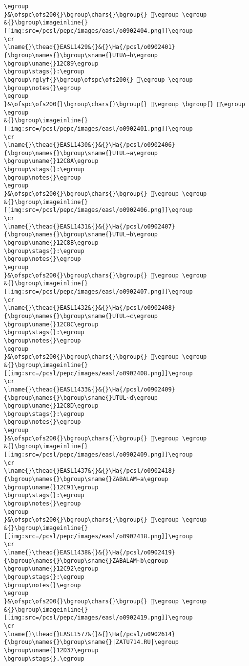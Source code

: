 \begin{verbatim}
\egroup
}&\ofspc\ofs200{}\bgroup\chars{}\bgroup{} 𒲇\egroup \egroup
&{}\bgroup\imageinline{}[[img:src=/pcsl/pepc/images/easl/o0902404.png]]\egroup
\cr
\lname{}\thead{}EASL1429&{}&{}\Ha{/pcsl/o0902401}{\bgroup\names{}\bgroup\sname{}UTUA∼b\egroup
\bgroup\uname{}12C89\egroup
\bgroup\stags{}:\egroup
\bgroup\rglyf{}\bgroup\ofspc\ofs200{} 𒲉\egroup \egroup
\bgroup\notes{}\egroup
\egroup
}&\ofspc\ofs200{}\bgroup\chars{}\bgroup{} 𒲈\egroup \bgroup{} 𒲉\egroup \egroup
&{}\bgroup\imageinline{}[[img:src=/pcsl/pepc/images/easl/o0902401.png]]\egroup
\cr
\lname{}\thead{}EASL1430&{}&{}\Ha{/pcsl/o0902406}{\bgroup\names{}\bgroup\sname{}UTUL∼a\egroup
\bgroup\uname{}12C8A\egroup
\bgroup\stags{}:\egroup
\bgroup\notes{}\egroup
\egroup
}&\ofspc\ofs200{}\bgroup\chars{}\bgroup{} 𒲊\egroup \egroup
&{}\bgroup\imageinline{}[[img:src=/pcsl/pepc/images/easl/o0902406.png]]\egroup
\cr
\lname{}\thead{}EASL1431&{}&{}\Ha{/pcsl/o0902407}{\bgroup\names{}\bgroup\sname{}UTUL∼b\egroup
\bgroup\uname{}12C8B\egroup
\bgroup\stags{}:\egroup
\bgroup\notes{}\egroup
\egroup
}&\ofspc\ofs200{}\bgroup\chars{}\bgroup{} 𒲋\egroup \egroup
&{}\bgroup\imageinline{}[[img:src=/pcsl/pepc/images/easl/o0902407.png]]\egroup
\cr
\lname{}\thead{}EASL1432&{}&{}\Ha{/pcsl/o0902408}{\bgroup\names{}\bgroup\sname{}UTUL∼c\egroup
\bgroup\uname{}12C8C\egroup
\bgroup\stags{}:\egroup
\bgroup\notes{}\egroup
\egroup
}&\ofspc\ofs200{}\bgroup\chars{}\bgroup{} 𒲌\egroup \egroup
&{}\bgroup\imageinline{}[[img:src=/pcsl/pepc/images/easl/o0902408.png]]\egroup
\cr
\lname{}\thead{}EASL1433&{}&{}\Ha{/pcsl/o0902409}{\bgroup\names{}\bgroup\sname{}UTUL∼d\egroup
\bgroup\uname{}12C8D\egroup
\bgroup\stags{}:\egroup
\bgroup\notes{}\egroup
\egroup
}&\ofspc\ofs200{}\bgroup\chars{}\bgroup{} 𒲍\egroup \egroup
&{}\bgroup\imageinline{}[[img:src=/pcsl/pepc/images/easl/o0902409.png]]\egroup
\cr
\lname{}\thead{}EASL1437&{}&{}\Ha{/pcsl/o0902418}{\bgroup\names{}\bgroup\sname{}ZABALAM∼a\egroup
\bgroup\uname{}12C91\egroup
\bgroup\stags{}:\egroup
\bgroup\notes{}\egroup
\egroup
}&\ofspc\ofs200{}\bgroup\chars{}\bgroup{} 𒲑\egroup \egroup
&{}\bgroup\imageinline{}[[img:src=/pcsl/pepc/images/easl/o0902418.png]]\egroup
\cr
\lname{}\thead{}EASL1438&{}&{}\Ha{/pcsl/o0902419}{\bgroup\names{}\bgroup\sname{}ZABALAM∼b\egroup
\bgroup\uname{}12C92\egroup
\bgroup\stags{}:\egroup
\bgroup\notes{}\egroup
\egroup
}&\ofspc\ofs200{}\bgroup\chars{}\bgroup{} 𒲒\egroup \egroup
&{}\bgroup\imageinline{}[[img:src=/pcsl/pepc/images/easl/o0902419.png]]\egroup
\cr
\lname{}\thead{}EASL1577&{}&{}\Ha{/pcsl/o0902614}{\bgroup\names{}\bgroup\sname{}|ZATU714.RU|\egroup
\bgroup\uname{}12D37\egroup
\bgroup\stags{}.\egroup

\end{verbatim}
